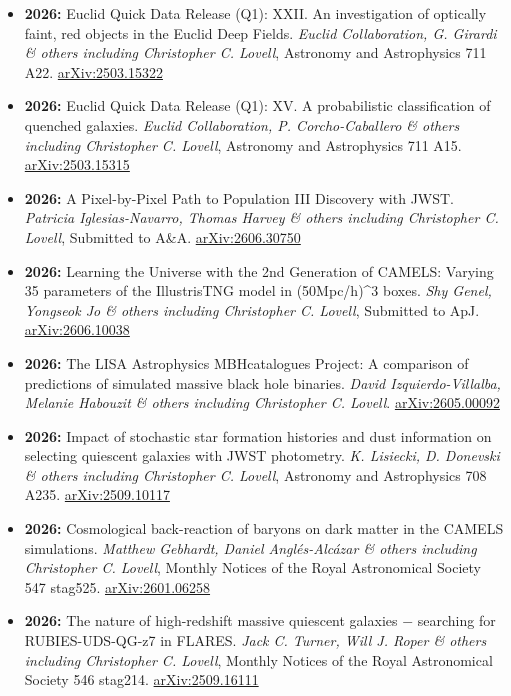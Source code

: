 \begin{itemize}
\item \textbf{2026:} Euclid Quick Data Release (Q1): XXII. An investigation of optically faint, red objects in the Euclid Deep Fields. \textit{Euclid Collaboration, G. Girardi \& others including Christopher C. Lovell}, Astronomy and Astrophysics 711 A22. \href{https://arxiv.org/abs/2503.15322}{arXiv:2503.15322}
\item \textbf{2026:} Euclid Quick Data Release (Q1): XV. A probabilistic classification of quenched galaxies. \textit{Euclid Collaboration, P. Corcho-Caballero \& others including Christopher C. Lovell}, Astronomy and Astrophysics 711 A15. \href{https://arxiv.org/abs/2503.15315}{arXiv:2503.15315}
\item \textbf{2026:} A Pixel-by-Pixel Path to Population III Discovery with JWST. \textit{Patricia Iglesias-Navarro, Thomas Harvey \& others including Christopher C. Lovell}, Submitted to A\&A. \href{https://arxiv.org/abs/2606.30750}{arXiv:2606.30750}
\item \textbf{2026:} Learning the Universe with the 2nd Generation of CAMELS: Varying 35 parameters of the IllustrisTNG model in (50Mpc/h)^3 boxes. \textit{Shy Genel, Yongseok Jo \& others including Christopher C. Lovell}, Submitted to ApJ. \href{https://arxiv.org/abs/2606.10038}{arXiv:2606.10038}
\item \textbf{2026:} The LISA Astrophysics MBHcatalogues Project: A comparison of predictions of simulated massive black hole binaries. \textit{David Izquierdo-Villalba, Melanie Habouzit \& others including Christopher C. Lovell}. \href{https://arxiv.org/abs/2605.00092}{arXiv:2605.00092}
\item \textbf{2026:} Impact of stochastic star formation histories and dust information on selecting quiescent galaxies with JWST photometry. \textit{K. Lisiecki, D. Donevski \& others including Christopher C. Lovell}, Astronomy and Astrophysics 708 A235. \href{https://arxiv.org/abs/2509.10117}{arXiv:2509.10117}
\item \textbf{2026:} Cosmological back-reaction of baryons on dark matter in the CAMELS simulations. \textit{Matthew Gebhardt, Daniel Anglés-Alcázar \& others including Christopher C. Lovell}, Monthly Notices of the Royal Astronomical Society 547 stag525. \href{https://arxiv.org/abs/2601.06258}{arXiv:2601.06258}
\item \textbf{2026:} The nature of high-redshift massive quiescent galaxies $-$ searching for RUBIES-UDS-QG-z7 in FLARES. \textit{Jack C. Turner, Will J. Roper \& others including Christopher C. Lovell}, Monthly Notices of the Royal Astronomical Society 546 stag214. \href{https://arxiv.org/abs/2509.16111}{arXiv:2509.16111}

\end{itemize}
